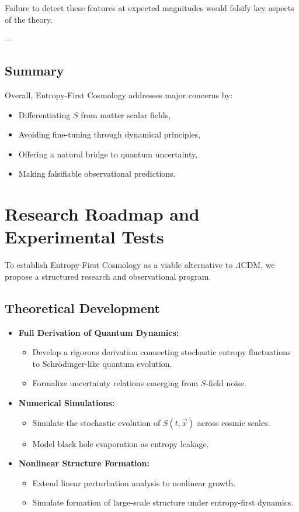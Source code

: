 \documentclass{article}
\begin{document}
Failure to detect these features at expected magnitudes would falsify key aspects of the theory.

---

\subsection{Summary}

Overall, Entropy-First Cosmology addresses major concerns by:
\begin{itemize}
    \item Differentiating $S$ from matter scalar fields,
    \item Avoiding fine-tuning through dynamical principles,
    \item Offering a natural bridge to quantum uncertainty,
    \item Making falsifiable observational predictions.
\end{itemize}

\section{Research Roadmap and Experimental Tests}

To establish Entropy-First Cosmology as a viable alternative to $\Lambda$CDM, we propose a structured research and observational program.

\subsection{Theoretical Development}

\begin{itemize}
    \item \textbf{Full Derivation of Quantum Dynamics:}
    \begin{itemize}
        \item Develop a rigorous derivation connecting stochastic entropy fluctuations to Schrödinger-like quantum evolution.
        \item Formalize uncertainty relations emerging from $S$-field noise.
    \end{itemize}
    
    \item \textbf{Numerical Simulations:}
    \begin{itemize}
        \item Simulate the stochastic evolution of $S(t, \vec{x})$ across cosmic scales.
        \item Model black hole evaporation as entropy leakage.
    \end{itemize}
    
    \item \textbf{Nonlinear Structure Formation:}
    \begin{itemize}
        \item Extend linear perturbation analysis to nonlinear growth.
        \item Simulate formation of large-scale structure under entropy-first dynamics.
    \end{itemize}
\end{itemize}
\end{document}
